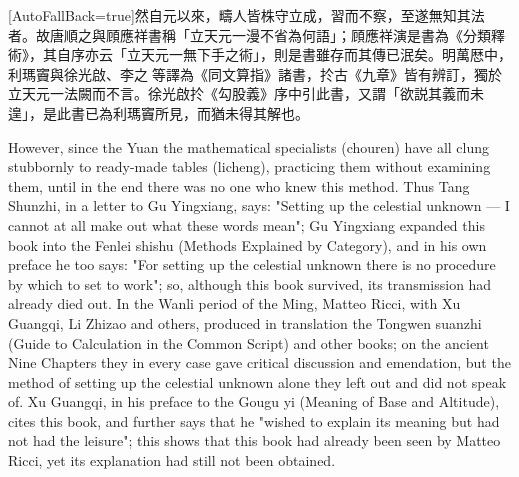 \documentclass[11pt]{article}
\newcommand{\unitlabel}[1]{\marginpar{\raggedleft\tiny\color{gray}#1}}
\newenvironment{unitzh}{\par\CJKfontspec{Noto Serif CJK SC}[AutoFallBack=true]\large\linespread{1.25}\selectfont}{\par}
\newenvironment{uniten}{\par\small\color{black!85}}{\par\medskip}
\begin{document}
\begin{unitzh}\unitlabel{ceyuan-001.4}然自元以來，疇人皆株守立成，習而不察，至遂無知其法者。故唐順之與頋應祥書稱「立天元一漫不省為何語」；頋應祥演是書為《分類釋術》，其自序亦云「立天元一無下手之術」，則是書雖存而其傳已泯矣。明萬厯中，利瑪竇與徐光啟、李之𧁑等譯為《同文算指》諸書，扵古《九章》皆有辨訂，獨於立天元一法闕而不言。徐光啟扵《勾股義》序中引此書，又謂「欲説其義而未遑」，是此書已為利瑪竇所見，而猶未得其解也。\end{unitzh}
\begin{uniten}However, since the Yuan the mathematical specialists (chouren) have all clung stubbornly to ready-made tables (licheng), practicing them without examining them, until in the end there was no one who knew this method. Thus Tang Shunzhi, in a letter to Gu Yingxiang, says: "Setting up the celestial unknown — I cannot at all make out what these words mean"; Gu Yingxiang expanded this book into the Fenlei shishu (Methods Explained by Category), and in his own preface he too says: "For setting up the celestial unknown there is no procedure by which to set to work"; so, although this book survived, its transmission had already died out. In the Wanli period of the Ming, Matteo Ricci, with Xu Guangqi, Li Zhizao and others, produced in translation the Tongwen suanzhi (Guide to Calculation in the Common Script) and other books; on the ancient Nine Chapters they in every case gave critical discussion and emendation, but the method of setting up the celestial unknown alone they left out and did not speak of. Xu Guangqi, in his preface to the Gougu yi (Meaning of Base and Altitude), cites this book, and further says that he "wished to explain its meaning but had not had the leisure"; this shows that this book had already been seen by Matteo Ricci, yet its explanation had still not been obtained.\end{uniten}
\end{document}

